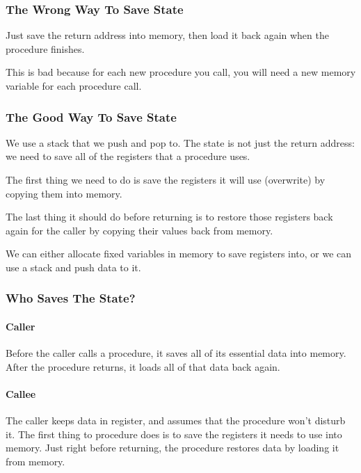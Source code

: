 \subsubsection{The Wrong Way To Save State}\label{ssub:the_wrong_way_to_save_state}

Just save the return address into memory, then load it back again when the procedure finishes.

This is bad because for each new procedure you call, you will need a new memory variable for each procedure call.

\subsubsection{The Good Way To Save State}\label{ssub:the_good_way_to_save_state}

We use a stack that we push and pop to.
The state is not just the return address: we need to save all of the registers that a procedure uses.

The first thing we need to do is save the registers it will use (overwrite) by copying them into memory.

The last thing it should do before returning is to restore those registers back again for the caller by copying their values back from memory.

We can either allocate fixed variables in memory to save registers into, or we can use a stack and push data to it.

\subsubsection{Who Saves The State?}\label{ssub:who_saves_the_state_}

\paragraph{Caller}\label{par:caller}

Before the caller calls a procedure, it saves all of its essential data into memory.
After the procedure returns, it loads all of that data back again.

\paragraph{Callee}\label{par:callee}

The caller keeps data in register, and assumes that the procedure won't disturb it.
The first thing to procedure does is to save the registers it needs to use into memory.
Just right before returning, the procedure restores data by loading it from memory.

